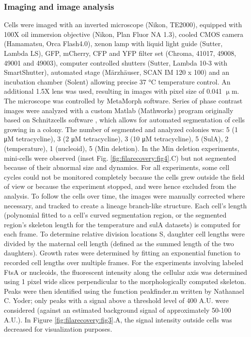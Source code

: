\subsubsection{Imaging and image analysis}
Cells were imaged with an inverted microscope (Nikon, TE2000), equipped with 100X oil immersion objective (Nikon, Plan Fluor NA 1.3), cooled CMOS camera (Hamamatsu, Orca Flash4.0), xenon lamp with liquid light guide (Sutter, Lambda LS), GFP, mCherry, CFP and YFP filter set (Chroma, 41017, 49008, 49001 and 49003), computer controlled shutters (Sutter, Lambda 10‐3 with SmartShutter), automated stage (Märzhäuser, SCAN IM 120 x 100) and an incubation chamber (Solent) allowing precise 37 °C temperature control. An additional 1.5X lens was used, resulting in images with pixel size of 0.041 $\upmu$m. The microscope was controlled by MetaMorph software. Series of phase contrast images were analyzed with a custom Matlab (Mathworks) program originally based on Schnitzcells software \cite{Young2012}, which allows for automated segmentation of cells growing in a colony. The number of segmented and analyzed colonies was: 5 (1 μM tetracycline), 3 (2 μM tetracycline), 3 (10 μM tetracycline), 5 (SulA), 2 (temperature), 1 (nucleoid), 5 (Min deletion). In the Min deletion experiments, mini-cells were observed (inset Fig. \ref{fig:filarecovery:fig4}.C) but not segmented because of their abnormal size and dynamics. For all experiments, some cell cycles could not be monitored completely because the cells grew outside the field of view or because the experiment stopped, and were hence excluded from the analysis. To follow the cells over time, the images were manually corrected where necessary, and tracked to create a lineage branch-like structure. Each cell’s length (polynomial fitted to a cell’s curved segmentation region, or the segmented region's skeleton length for the temperature and sulA datasets) is computed for each frame. To determine relative division locations S, daughter cell lengths were divided by the maternal cell length (defined as the summed length of the two daughters). Growth rates were determined by fitting an exponential function to recorded cell lengths over multiple frames. For the experiments involving labeled FtsA or nucleoids, the fluorescent intensity along the cellular axis was determined using 1 pixel wide slices perpendicular to the morphologically computed skeleton. Peaks were then identified using the function peakfinder.m written by Nathanael C. Yoder; only peaks with a signal above a threshold level of 400 A.U. were considered (against an estimated background signal of approximately 50-100 A.U.). In Figure \ref{fig:filarecovery:fig3}.A, the signal intensity outside cells was decreased for visualization purposes.

